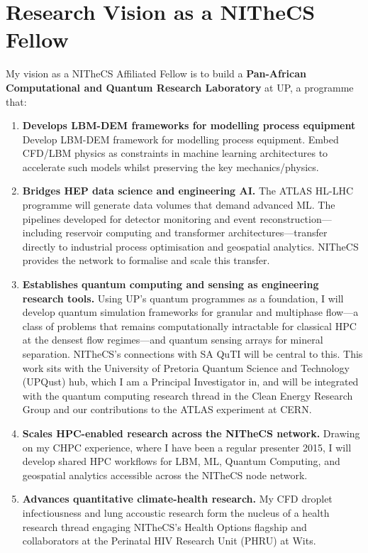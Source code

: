 \documentclass[11pt,a4paper]{article}
\begin{document}
\section{Research Vision as a NITheCS Fellow}

My vision as a NITheCS Affiliated Fellow is to build a \textbf{Pan-African Computational and Quantum Research Laboratory} at UP, a programme that:

\begin{enumerate}
  \item \textbf{Develops LBM-DEM frameworks for modelling process equipment} Develop LBM-DEM framework for modelling process equipment. Embed CFD/LBM physics as constraints in machine learning architectures to accelerate such models whilst preserving the key mechanics/physics. 

  \item \textbf{Bridges HEP data science and engineering AI.} The ATLAS HL-LHC programme will generate data volumes that demand advanced ML. The pipelines developed for detector monitoring and event reconstruction---including reservoir computing and transformer architectures---transfer directly to industrial process optimisation and geospatial analytics. NITheCS provides the network to formalise and scale this transfer.

  \item \textbf{Establishes quantum computing and sensing as engineering research tools.} Using UP's quantum programmes as a foundation, I will develop quantum simulation frameworks for granular and multiphase flow---a class of problems that remains computationally intractable for classical HPC at the densest flow regimes---and quantum sensing arrays for mineral separation. NITheCS's connections with SA QuTI will be central to this. This work sits with the University of Pretoria Quantum Science and Technology (UPQust) hub, which I am a Principal Investigator in, and will be integrated with the quantum computing research thread in the Clean Energy Research Group and our contributions to the ATLAS experiment at CERN.

  \item \textbf{Scales HPC-enabled research across the NITheCS network.} Drawing on my CHPC experience, where I have been a regular presenter 2015, I will develop shared HPC workflows for LBM, ML, Quantum Computing, and geospatial analytics accessible across the NITheCS node network.

  \item \textbf{Advances quantitative climate-health research.} My CFD droplet infectiousness and lung accoustic research form the nucleus of a health research thread engaging NITheCS's Health Options flagship and collaborators at the Perinatal HIV Research Unit (PHRU) at Wits.
\end{enumerate}
\end{document}
